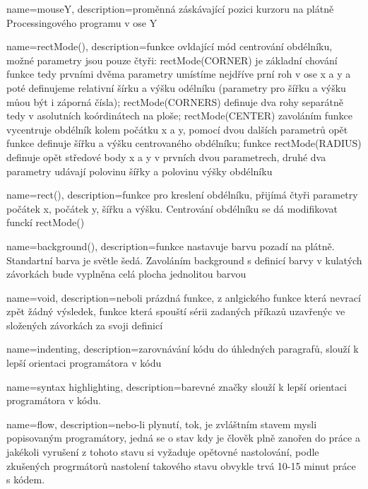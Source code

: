 {
  name={mouseY},
  description={proměnná záskávající pozici kurzoru na plátně Processingového programu v ose Y}
}

{
  name={rectMode()},
  description={funkce ovldající mód centrování obdélníku, možné parametry jsou pouze čtyři:  rectMode(CORNER) je základní chování funkce  tedy prvními dvěma parametry umístíme nejdříve prní roh v ose x a y a poté definujeme relativní šírku a výšku odélníku (parametry pro šířku a výšku můou být i záporná čísla); rectMode(CORNERS) definuje dva rohy separátně tedy v asolutních koórdinátech na ploše; rectMode(CENTER) zavoláním funkce  vycentruje obdélník kolem počátku x a y, pomocí dvou dalších parametrů opět funkce  definuje šířku a výšku centrovaného obdélníku; funkce rectMode(RADIUS) definuje opět středové body x a y v prvních dvou parametrech, druhé dva parametry udávají polovinu šířky a polovinu výšky obdélníku}
}

{
  name={rect()},
  description={funkce pro kreslení obdélníku, přijímá čtyři parametry počátek x, počátek y, šířku a výšku. Centrování obdélníku se dá modifikovat funckí rectMode()}
}

{
  name={background()},
  description={funkce nastavuje barvu pozadí na plátně. Standartní barva je světle šedá. Zavoláním background s definicí barvy v kulatých závorkách bude vyplněna celá plocha jednolitou barvou}
}


{
  name={void},
  description={neboli prázdná funkce, z anlgického  funkce která nevrací zpět žádný výsledek, funkce která spouští sérii zadaných příkazů uzavřenýc ve složených závorkách za svoji definicí}
}

{
  name={indenting},
  description={zarovnávání kódu do úhledných paragrafů, slouží k lepší orientaci programátora v kódu}
}


{
  name={syntax highlighting},
  description={barevné značky slouží k lepší orientaci programátora v kódu.}
}

{
  name={flow},
  description={nebo-li plynutí, tok, je zvláštním stavem mysli popisovaným programátory, jedná se o stav kdy je člověk plně zanořen do práce a jakékoli vyrušení z tohoto stavu si vyžaduje opětovné nastolování, podle zkušených progrmátorů nastolení takového stavu obvykle trvá 10-15 minut práce s kódem.}
}

